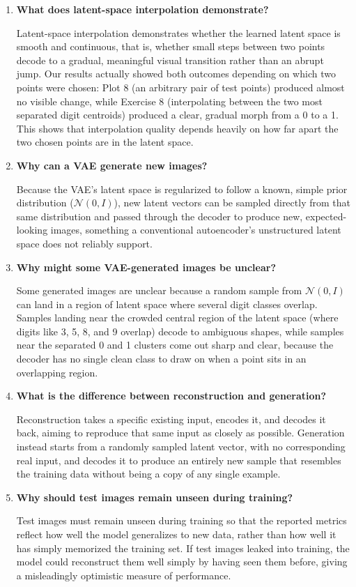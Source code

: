 \documentclass[10pt]{article}
\begin{document}
\begin{enumerate}
\item \textbf{What does latent-space interpolation demonstrate?}

Latent-space interpolation demonstrates whether the learned latent space is smooth and continuous, that is, whether small steps between two points decode to a gradual, meaningful visual transition rather than an abrupt jump. Our results actually showed both outcomes depending on which two points were chosen: Plot 8 (an arbitrary pair of test points) produced almost no visible change, while Exercise 8 (interpolating between the two most separated digit centroids) produced a clear, gradual morph from a 0 to a 1. This shows that interpolation quality depends heavily on how far apart the two chosen points are in the latent space.

\item \textbf{Why can a VAE generate new images?}

Because the VAE's latent space is regularized to follow a known, simple prior distribution ($\mathcal{N}(0, I)$), new latent vectors can be sampled directly from that same distribution and passed through the decoder to produce new, expected-looking images, something a conventional autoencoder's unstructured latent space does not reliably support.

\item \textbf{Why might some VAE-generated images be unclear?}

Some generated images are unclear because a random sample from $\mathcal{N}(0, I)$ can land in a region of latent space where several digit classes overlap. Samples landing near the crowded central region of the latent space (where digits like 3, 5, 8, and 9 overlap) decode to ambiguous shapes, while samples near the separated 0 and 1 clusters come out sharp and clear, because the decoder has no single clean class to draw on when a point sits in an overlapping region.

\item \textbf{What is the difference between reconstruction and generation?}

Reconstruction takes a specific existing input, encodes it, and decodes it back, aiming to reproduce that same input as closely as possible. Generation instead starts from a randomly sampled latent vector, with no corresponding real input, and decodes it to produce an entirely new sample that resembles the training data without being a copy of any single example.

\item \textbf{Why should test images remain unseen during training?}

Test images must remain unseen during training so that the reported metrics reflect how well the model generalizes to new data, rather than how well it has simply memorized the training set. If test images leaked into training, the model could reconstruct them well simply by having seen them before, giving a misleadingly optimistic measure of performance.

\end{enumerate}
\end{document}
